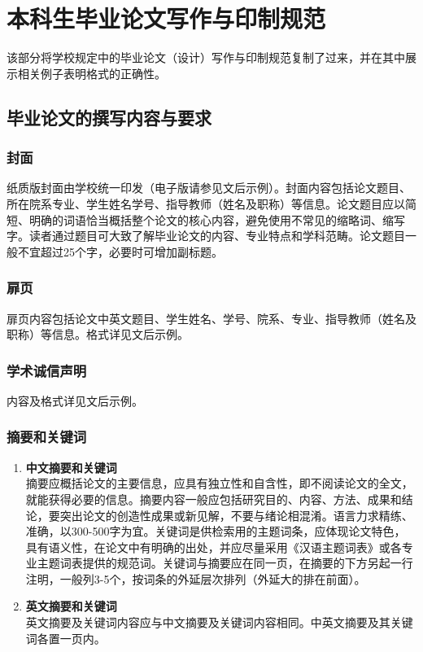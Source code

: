 \chapter{本科生毕业论文写作与印制规范}

\label{cha:sysu-thesis-contents-format-requirement}


该部分将学校规定中的毕业论文（设计）写作与印制规范复制了过来，并在其中展示相关例子表明格式的正确性。


\section{毕业论文的撰写内容与要求}

\subsection{封面}


纸质版封面由学校统一印发（电子版请参见文后示例）。封面内容包括论文题目、所在院系专业、学生姓名学号、指导教师（姓名及职称）等信息。论文题目应以简短、明确的词语恰当概括整个论文的核心内容，避免使用不常见的缩略词、缩写字。读者通过题目可大致了解毕业论文的内容、专业特点和学科范畴。论文题目一般不宜超过25个字，必要时可增加副标题。

\subsection{扉页}

扉页内容包括论文中英文题目、学生姓名、学号、院系、专业、指导教师（姓名及职称）等信息。格式详见文后示例。

\subsection{学术诚信声明}

内容及格式详见文后示例。

\subsection{摘要和关键词}

\begin{enumerate}
    \item \textbf{中文摘要和关键词} \\
          摘要应概括论文的主要信息，应具有独立性和自含性，即不阅读论文的全文，就能获得必要的信息。摘要内容一般应包括研究目的、内容、方法、成果和结论，要突出论文的创造性成果或新见解，不要与绪论相混淆。语言力求精练、准确，以300-500字为宜。关键词是供检索用的主题词条，应体现论文特色，具有语义性，在论文中有明确的出处，并应尽量采用《汉语主题词表》或各专业主题词表提供的规范词。关键词与摘要应在同一页，在摘要的下方另起一行注明，一般列3-5个，按词条的外延层次排列（外延大的排在前面）。
    \item \textbf{英文摘要和关键词} \\
          英文摘要及关键词内容应与中文摘要及关键词内容相同。中英文摘要及其关键词各置一页内。
\end{enumerate}

